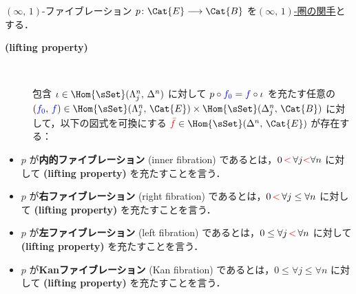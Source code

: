 \documentclass[TQFT_main]{subfiles}
\begin{document}
\begin{mydef}[label=def:infty-fib]{{$(\infty,\, 1)$}-ファイブレーション}
    $p \colon \Cat{E} \lto \Cat{B}$ を\hyperref[def:infty-1]{$(\infty,\, 1)$-圏の関手}とする．
    \begin{description}
        \item[\textbf{(lifting property)}]　
        
        包含 $\iota \in \Hom{\sSet}(\Lambda^n_j,\, \Delta^n)$ に対して $p \circ \textcolor{blue}{f_0} = \textcolor{blue}{f} \circ \iota$ を充たす任意の $(\textcolor{blue}{f_0},\, \textcolor{blue}{f}) \in \Hom{\sSet}(\Lambda^n_j,\, \Cat{E}) \times \Hom{\sSet}(\Delta^n_j,\, \Cat{B})$ に対して，以下の図式を可換にする $\textcolor{red}{\bar{f}} \in \Hom{\sSet}(\Delta^n,\, \Cat{E})$ が存在する：
        \begin{center}
        \end{center}
    \end{description}
    \tcblower
    \begin{itemize}
        \item $p$ が\textbf{内的ファイブレーション} (inner fibration) であるとは，$0 \,\textcolor{red}{<}\, \forall j \textcolor{red}{<} \forall n$ に対して \textsf{\textbf{(lifting property)}} を充たすことを言う．
        \item $p$ が\textbf{右ファイブレーション} (right fibration) であるとは，$0 \,\textcolor{red}{<}\, \forall j \le \forall n$ に対して \textsf{\textbf{(lifting property)}} を充たすことを言う．
        \item $p$ が\textbf{左ファイブレーション} (left fibration) であるとは，$0 \le \forall j \,\textcolor{red}{<}\, \forall n$ に対して \textsf{\textbf{(lifting property)}} を充たすことを言う．
        \item $p$ が\textbf{Kanファイブレーション} (Kan fibration) であるとは，$0 \le \forall j \le \forall n$ に対して \textsf{\textbf{(lifting property)}} を充たすことを言う．
    \end{itemize}
\end{mydef}
\end{document}
